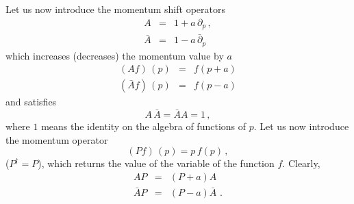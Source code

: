 \documentclass[a4paper,12pt]{article}
\begin{document}
Let us now introduce the momentum shift operators 
\begin{eqnarray}
     A & = & 1 + a \, \partial_{p} \, ,
    \label{eq:a} \\
    \bar{A}  & = & 1 - a \, \bar{\partial}_{p}
    \label{eq:abarra}  
\end{eqnarray}
which increases (decreases) the momentum value by $a$
\begin{eqnarray}
    (Af) \, (p) & = & f(p+a)
    \label{eq:af} \\
    (\bar{A} f) \, (p) & = & f(p-a)
    \label{eq:abarraf}  
\end{eqnarray}
and satisfies 
\begin{equation}
    A \, \bar{A} = \bar{A} A = 1 \, ,
    \label{eq:aabarra}
\end{equation}
where $1$ means the identity on the algebra of functions of $p$.  Let us 
now introduce the momentum operator \cite{dimakis1}
\begin{equation}
    (Pf) \, (p) = p \, f(p) \, ,
    \label{eq:momentum}
\end{equation}
($P^\dagger = P$), which returns the value of the variable 
of the function $f$.  Clearly, 
\begin{eqnarray}
    AP & = & (P+a)A
    \label{eq:ap}  \\
    \bar{A}P & = & (P-a) \bar{A} \, \, .
    \label{eq:abarrap}
\end{eqnarray}
\end{document}
